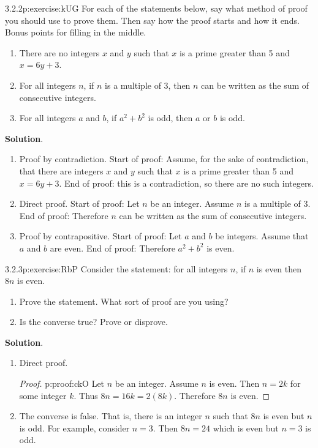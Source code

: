 \documentclass[twoside,11pt,]{book}
\newcommand{\blocktitlefont}{\relax}
\numberwithin{equation}{chapter}
\begin{document}
\begin{divisionsolution}{3.2.2}{}{p:exercise:kUG}%
For each of the statements below, say what method of proof you should use to prove them. Then say how the proof starts and how it ends. Bonus points for filling in the middle.%
\begin{enumerate}[label=(\alph*)]
\item{}There are no integers \(x\) and \(y\) such that \(x\) is a prime greater than 5 and \(x = 6y + 3\).%
\item{}For all integers \(n\), if \(n\) is a multiple of 3, then \(n\) can be written as the sum of consecutive integers.%
\item{}For all integers \(a\) and \(b\), if \(a^2 + b^2\) is odd, then \(a\) or \(b\) is odd.%
\end{enumerate}
%
\par\smallskip%
\noindent\textbf{\blocktitlefont Solution}.\quad{}%
\begin{enumerate}[label=(\alph*)]
\item{}Proof by contradiction. Start of proof: Assume, for the sake of contradiction, that there are integers \(x\) and \(y\) such that \(x\) is a prime greater than 5 and \(x = 6y + 3\). End of proof: \textellipsis{} this is a contradiction, so there are no such integers.%
\item{}Direct proof. Start of proof: Let \(n\) be an integer. Assume \(n\) is a multiple of 3. End of proof: Therefore \(n\) can be written as the sum of consecutive integers.%
\item{}Proof by contrapositive. Start of proof: Let \(a\) and \(b\) be integers. Assume that \(a\) and \(b\) are even. End of proof: Therefore \(a^2 + b^2\) is even.%
\end{enumerate}
%
\end{divisionsolution}%
\begin{divisionsolution}{3.2.3}{}{p:exercise:RbP}%
Consider the statement: for all integers \(n\), if \(n\) is even then \(8n\) is even.%
\begin{enumerate}[label=(\alph*)]
\item{}Prove the statement. What sort of proof are you using?%
\item{}Is the converse true? Prove or disprove.%
\end{enumerate}
%
\par\smallskip%
\noindent\textbf{\blocktitlefont Solution}.\quad{}%
\begin{enumerate}[label=(\alph*)]
\item{}Direct proof. \begin{proof}{}{p:proof:ckO}
Let \(n\) be an integer. Assume \(n\) is even. Then \(n = 2k\) for some integer \(k\). Thus \(8n = 16k = 2(8k)\). Therefore \(8n\) is even.%
\end{proof}
%
\item{}The converse is false. That is, there is an integer \(n\) such that \(8n\) is even but \(n\) is odd. For example, consider \(n = 3\). Then \(8n = 24\) which is even but \(n = 3\) is odd.%
\end{enumerate}
%
\end{divisionsolution}%
\end{document}
